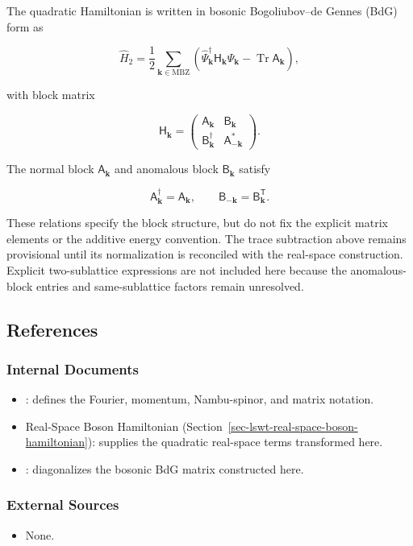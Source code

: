 The quadratic Hamiltonian is written in bosonic Bogoliubov--de Gennes (BdG) form as

\[
\hat H_2
=\frac12\sum_{\mathbf k\in\mathrm{MBZ}}
\left(
\hat\Psi_{\mathbf k}^\dagger\mathsf H_{\mathbf k}\hat\Psi_{\mathbf k}
-\operatorname{Tr}\mathsf A_{\mathbf k}
\right),
\]

with block matrix

\[
\mathsf H_{\mathbf k}
=\begin{pmatrix}
\mathsf A_{\mathbf k} & \mathsf B_{\mathbf k}\\
\mathsf B_{\mathbf k}^\dagger & \mathsf A_{-\mathbf k}^*
\end{pmatrix}.
\]

The normal block \(\mathsf A_{\mathbf k}\) and anomalous block \(\mathsf B_{\mathbf k}\) satisfy

\[
\mathsf A_{\mathbf k}^\dagger=\mathsf A_{\mathbf k},
\qquad
\mathsf B_{-\mathbf k}=\mathsf B_{\mathbf k}^{\mathsf T}.
\]

These relations specify the block structure, but do not fix the explicit matrix elements or the additive energy convention. The trace subtraction above remains provisional until its normalization is reconciled with the real-space construction. Explicit two-sublattice expressions are not included here because the anomalous-block entries and same-sublattice factors remain unresolved.

\subsection{References}

\subsubsection{Internal Documents}

\begin{itemize}
\tightlist
\item
  : defines the Fourier, momentum, Nambu-spinor, and matrix notation.
\item
  Real-Space Boson Hamiltonian (Section~\ref{sec-lswt-real-space-boson-hamiltonian}): supplies the quadratic real-space terms transformed here.
\item
  : diagonalizes the bosonic BdG matrix constructed here.
\end{itemize}

\subsubsection{External Sources}

\begin{itemize}
\tightlist
\item
  None.
\end{itemize}
